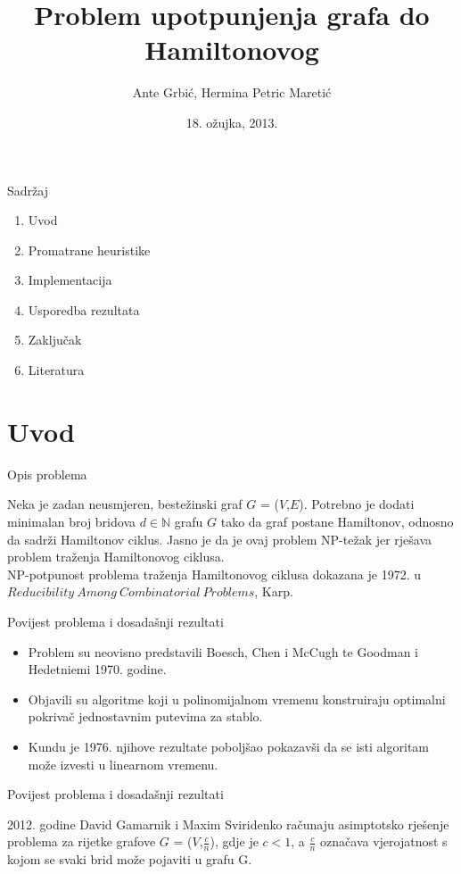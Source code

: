 \documentclass{beamer}
\title[Problem upotpunjenja grafa do Hamiltonovog]{Problem upotpunjenja grafa do Hamiltonovog}
\author{Ante Grbi\'{c}, Hermina Petric Mareti\'{c}}
\institute{Prirodoslovno-matemati\v{c}ki fakultet - Matemati\v{c}ki odjel \\ Seminar za teorijsko ra\v{c}unarstvo}
\date{18. ožujka, 2013.}
\begin{document}
\begin{frame}
\titlepage
\end{frame}

\begin{frame}{Sadr\v{z}aj}
\begin{enumerate}
\item Uvod
\item Promatrane heuristike
\item Implementacija
\item Usporedba rezultata
\item Zaklju\v{c}ak
\item Literatura
\end{enumerate}
\end{frame}

\section{Uvod}

\begin{frame}{Opis problema}

Neka je zadan neusmjeren, beste\v{z}inski graf $G$ = ($V$,$E$). Potrebno je dodati minimalan broj bridova $d \in \mathbb N$ grafu $G$ tako da graf postane Hamiltonov, odnosno da sadrži Hamiltonov ciklus.
Jasno je da je ovaj problem NP-te\v{z}ak jer rješava problem traženja Hamiltonovog ciklusa.\\
NP-potpunost problema traženja Hamiltonovog ciklusa dokazana je 1972. u $Reducibility\:Among\:Combinatorial\:Problems$, Karp. 

\end{frame}


\begin{frame}{Povijest problema i dosada\v{s}nji rezultati}

\begin{itemize}
\item Problem su neovisno predstavili Boesch, Chen i McCugh te Goodman i Hedetniemi 1970. godine. 
\item Objavili su algoritme koji u polinomijalnom vremenu konstruiraju optimalni pokriva\v{c} jednostavnim putevima za stablo.
\item Kundu je 1976. njihove rezultate pobolj\v{s}ao pokazav\v{s}i da se isti algoritam mo\v{z}e izvesti u linearnom vremenu.
\end{itemize}

\end{frame}

\begin{frame}{Povijest problema i dosada\v{s}nji rezultati}

2012. godine David Gamarnik i Maxim Sviridenko ra\v{c}unaju asimptotsko rje\v{s}enje problema za rijetke grafove $G$ = ($V$,$\frac{c} {n}$),  gdje je $c < 1$, a $\frac{c} {n}$ ozna\v{c}ava vjerojatnost s kojom se svaki brid mo\v{z}e pojaviti u grafu G. 
\end{frame}
\end{document}
